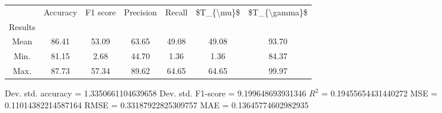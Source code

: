 \begin{tabular}{|c|c|c|c|c|c|c|}
\toprule
{} &  Accuracy &  F1 score &  Precision &  Recall &  \$T\_\{\textbackslash mu\}\$ &  \$T\_\{\textbackslash gamma\}\$ \\
Results &           &           &            &         &            &               \\
\hline
Mean    &     86.41 &     53.09 &      63.65 &   49.08 &      49.08 &         93.70 \\
Min.    &     81.15 &      2.68 &      44.70 &    1.36 &       1.36 &         84.37 \\
Max.    &     87.73 &     57.34 &      89.62 &   64.65 &      64.65 &         99.97 \\
\bottomrule
\end{tabular}

 Dev. std. accuracy = 1.3350661104639658
 Dev. std. F1-score = 9.199648693931346
 $R^2$ = 0.19455654431440272
 MSE = 0.11014382214587164
 RMSE = 0.33187922825309757
 MAE = 0.13645774602982935
